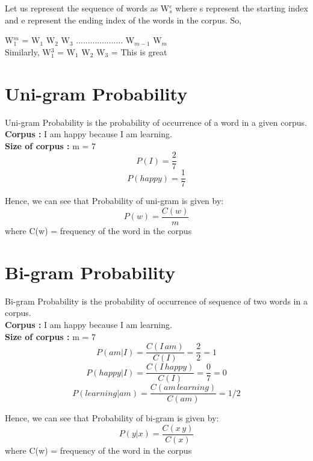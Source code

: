 Let us represent the sequence of words as W$_s^e$ where s represent the starting index and e represent the ending index of the words in the corpus. So,

W$_1^m$ = W$_1$ W$_2$ W$_3$ ....................  W$_{m-1}$ W$_m$
\\
Similarly,  W$_1^3$ = W$_1$ W$_2$ W$_3$ = This is great

\section{Uni-gram Probability}
Uni-gram Probability is the probability of occurrence of a word in a given corpus.
\\
\textbf{Corpus :} I am happy because I am learning.
\\
\textbf{Size of corpus : } m = 7
\begin{equation}
	P(I) = \frac{2}{7}
\end{equation}
\begin{equation}
	P(happy) = \frac{1}{7}
\end{equation}

Hence, we can see that Probability of uni-gram is given by:
\begin{equation}
	P(w) = \frac{C(w)}{m}
\end{equation}
where C(w) = frequency of the word in the corpus

\section{Bi-gram Probability}
Bi-gram Probability is the probability of occurrence of sequence of two words in a corpus.
\\
\textbf{Corpus :} I am happy because I am learning.
\\
\textbf{Size of corpus : } m = 7
\begin{equation}
	P(am | I) = \frac{C(I\, am)}{C(I)} = \frac{2}{2} = 1
\end{equation}
\begin{equation}
	P(happy | I) = \frac{C(I \, happy)}{C(I)}= \frac{0}{7} = 0
\end{equation}
\begin{equation}
	P(learning | am) = \frac{C(am \, learning)}{C(am)} = 1 / 2
\end{equation}

Hence, we can see that Probability of bi-gram is given by:
\begin{equation}
	P(y | x) = \frac{C(x\, y)}{C(x)}
\end{equation}
where C(w) = frequency of the word in the corpus

